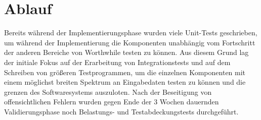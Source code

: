 \section{Ablauf}

Bereits während der Implementierungsphase wurden viele Unit-Tests geschrieben, um während der Implementierung die Komponenten unabhängig vom Fortschritt der anderen Bereiche von Worthwhile testen zu können. Aus diesem Grund lag der initiale Fokus auf der Erarbeitung von Integrationstests und auf dem Schreiben von größeren Testprogrammen, um die einzelnen Komponenten mit einem möglichst breiten Spektrum an Eingabedaten testen zu können und die grenzen des Softwaresystems auszuloten. Nach der Beseitigung von offensichtlichen Fehlern wurden gegen Ende der 3 Wochen dauernden Validierungsphase noch Belastungs- und Testabdeckungstests durchgeführt.
